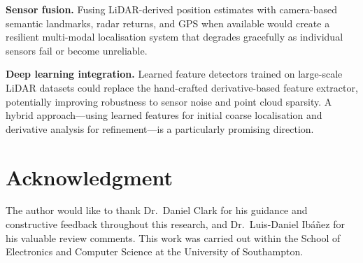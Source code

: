 \documentclass[lettersize,journal]{IEEEtran}
\begin{document}
\textbf{Sensor fusion.} Fusing LiDAR-derived position estimates with
camera-based semantic landmarks, radar returns, and GPS when available
would create a resilient multi-modal localisation system that degrades
gracefully as individual sensors fail or become unreliable.

\textbf{Deep learning integration.} Learned feature detectors trained on
large-scale LiDAR datasets could replace the hand-crafted derivative-based
feature extractor, potentially improving robustness to sensor noise and
point cloud sparsity. A hybrid approach---using learned features for
initial coarse localisation and derivative analysis for refinement---is
a particularly promising direction.

\section*{Acknowledgment}

The author would like to thank Dr.\ Daniel Clark for his guidance and
constructive feedback throughout this research, and Dr.\ Luis-Daniel
Ib\'{a}\~{n}ez for his valuable review comments. This work was carried
out within the School of Electronics and Computer Science at the
University of Southampton.
\end{document}
